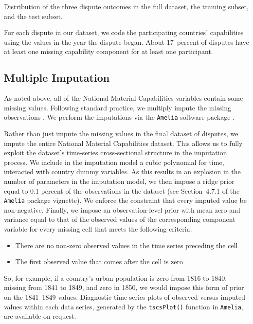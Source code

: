 \begin{table}[htp]
  \centering
  
  \caption{
    Distribution of the three dispute outcomes in the full dataset, the training subset, and the test subset.
  }
  \label{tab:mid}
\end{table}

For each dispute in our dataset, we code the participating countries' capabilities using the values in the year the dispute began.
About 17~percent of disputes have at least one missing capability component for at least one participant.

\subsection{Multiple Imputation}

As noted above, all of the National Material Capabilities variables contain some missing values.
Following standard practice, we multiply impute the missing observations \citep{honaker_what_2010}.
We perform the imputations via the \texttt{Amelia} software package \citep{pkg-Amelia}.

Rather than just impute the missing values in the final dataset of disputes, we impute the entire National Material Capabilities dataset.
This allows us to fully exploit the dataset's time-series cross-sectional structure in the imputation process.
We include in the imputation model a cubic polynomial for time, interacted with country dummy variables.
As this results in an explosion in the number of parameters in the imputation model, we then impose a ridge prior equal to 0.1 percent of the observations in the dataset (see Section~4.7.1 of the \texttt{Amelia} package vignette).
We enforce the constraint that every imputed value be non-negative.
Finally, we impose an observation-level prior with mean zero and variance equal to that of the observed values of the corresponding component variable for every missing cell that meets the following criteria:
\begin{itemize}
  \item There are no non-zero observed values in the time series preceding the cell
  \item The first observed value that comes after the cell is zero
\end{itemize}
So, for example, if a country's urban population is zero from 1816 to 1840, missing from 1841 to 1849, and zero in 1850, we would impose this form of prior on the 1841--1849 values.
Diagnostic time series plots of observed versus imputed values within each data series, generated by the \texttt{tscsPlot()} function in \texttt{Amelia}, are available on request.

